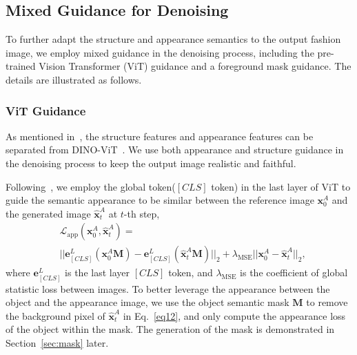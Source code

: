 \subsection{Mixed Guidance for Denoising}

To further adapt the structure and appearance semantics to the output fashion image, we employ mixed guidance in the denoising process, including the pre-trained Vision Transformer (ViT) guidance and a foreground mask guidance. The details are illustrated as follows.

\subsubsection{ViT Guidance}
As mentioned in~\cite{tumanyan2022splicing,kwon2022diffusion}, the structure features and appearance features can be separated from DINO-ViT~\cite{amir2021deep}. We use both appearance and structure guidance in the denoising process to keep the output image realistic and faithful. 

Following~\cite{tumanyan2022splicing,kwon2022diffusion}, we employ the global token($[CLS]$ token) in the last layer of ViT to guide the semantic appearance to be similar between the reference image $\mathbf{x}^{A}_0$ and the generated image $\hat{\mathbf{x}}^{A}_t$ at $t$-th step,
\begin{equation}
\begin{aligned}
\label{eq12}
& \mathcal{L}_{\text{app}}(\mathbf{x}^{A}_0,\hat{\mathbf{x}}^{A}_t) = \\
& ||\boldsymbol{e}_{[CLS]}^L(\mathbf{x}^{A}_0\boldsymbol{M})-\boldsymbol{e}_{[CLS]}^L({\hat{\mathbf{x}}^{A}_t}\boldsymbol{M})||_2 + \lambda_{\text{MSE}}||\mathbf{x}^{A}_0-{\hat{\mathbf{x}}^{A}_t}||_2,
\end{aligned}
\end{equation}
where $\boldsymbol{e}_{[CLS]}^L$ is the last layer $[CLS]$ token, and $\lambda_{\text{MSE}}$ is the coefficient of global statistic loss between images.
To better leverage the appearance between the object and the appearance image,
we use the object semantic mask $\boldsymbol{M}$ to remove the background pixel of $\hat{\mathbf{x}}^{A}_t$ in Eq.~\ref{eq12}, and only compute the appearance loss of the object within the mask. The generation of the mask is demonstrated in Section~\ref{sec:mask} later.

